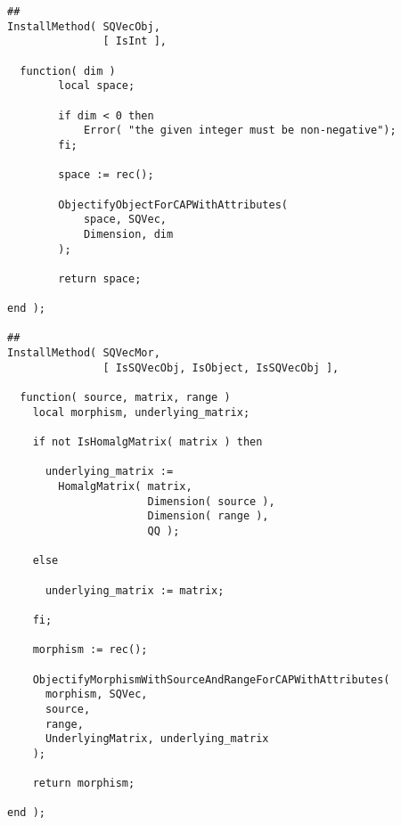 \begin{small}
\begin{Verbatim}[frame=single]
##
InstallMethod( SQVecObj,
               [ IsInt ],
               
  function( dim )
        local space;
        
        if dim < 0 then
            Error( "the given integer must be non-negative");
        fi;
        
        space := rec();
        
        ObjectifyObjectForCAPWithAttributes(
            space, SQVec,
            Dimension, dim
        );
        
        return space;
        
end );

##
InstallMethod( SQVecMor,
               [ IsSQVecObj, IsObject, IsSQVecObj ],
                  
  function( source, matrix, range )
    local morphism, underlying_matrix;

    if not IsHomalgMatrix( matrix ) then
    
      underlying_matrix := 
        HomalgMatrix( matrix,
                      Dimension( source ),
                      Dimension( range ),
                      QQ );

    else

      underlying_matrix := matrix;

    fi;
    
    morphism := rec();
    
    ObjectifyMorphismWithSourceAndRangeForCAPWithAttributes( 
      morphism, SQVec,
      source,
      range,
      UnderlyingMatrix, underlying_matrix
    );
    
    return morphism;
    
end );
\end{Verbatim}
\end{small}